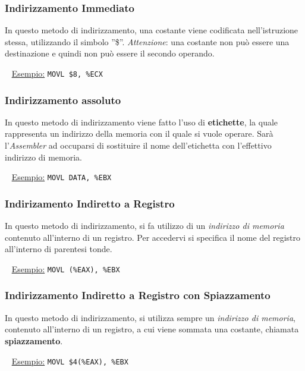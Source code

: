 \documentclass[a4paper,11pt,oneside]{book}
\begin{document}
\subsubsection{Indirizzamento Immediato}
In questo metodo di indirizzamento, una costante viene codificata nell'istruzione stessa, utilizzando il simbolo ''\$''.
\newline \emph{Attenzione}: una costante non può essere una destinazione e quindi non può essere il secondo operando.

~\newline
\underline{Esempio:} \tabto{3cm} \texttt{MOVL \$8, \%ECX}


\subsubsection{Indirizzamento assoluto}
In questo metodo di indirizzamento viene fatto l'uso di \textbf{etichette}, la quale rappresenta un indirizzo della memoria con il quale si vuole operare.
\newline Sarà l'\emph{Assembler} ad occuparsi di sostituire il nome dell'etichetta con l'effettivo indirizzo di memoria.

~\newline
\underline{Esempio:} \tabto{3cm} \texttt{MOVL DATA, \%EBX}


\subsubsection{Indirizamento Indiretto a Registro}
In questo metodo di indirizzamento, si fa utilizzo di un \emph{indirizzo di memoria} contenuto all'interno di un registro. Per accedervi si specifica
il nome del registro all'interno di parentesi tonde.

~\newline
\underline{Esempio:} \tabto{3cm} \texttt{MOVL (\%EAX), \%EBX}

\subsubsection{Indirizzamento Indiretto a Registro con Spiazzamento}
In questo metodo di indirizzamento, si utilizza sempre un \emph{indirizzo di memoria}, contenuto all'interno di un registro, a cui viene sommata una costante, chiamata \textbf{spiazzamento}.

~\newline
\underline{Esempio:} \tabto{3cm} \texttt{MOVL \$4(\%EAX), \%EBX}
\end{document}
